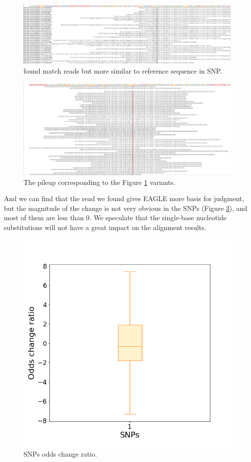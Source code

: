 \begin{figure}[H]
\centering
\includegraphics[width=1\columnwidth]{body/image/snp_new_REFread.png}
\caption[SNP worse match reads]{ found match reads but more similar to reference sequence in SNP.}
\label{snp_new_REFread}
\end{figure}

\begin{figure}[H]
\centering
\includegraphics[width=1\columnwidth]{body/image/snp_pileup_REFread.png}
\caption[SNP worse match reads pileup]{The pileup corresponding to the Figure \ref{snp_new_REFread} variants.}
\label{snp_pileup_REFread}
\end{figure}

And we can find that the read we found gives EAGLE more basis for judgment, but the magnitude of the change is not very obvious in the SNPs (Figure \ref{snp_odds_change}), and most of them are less than 0. We speculate that the single-base nucleotide substitutions will not have a great impact on the alignment results.

\begin{figure}[H]
\centering
\includegraphics[width=0.6\columnwidth]{body/image/snp_odds_change.png}
\caption[SNPs odds change ratio]{SNPs odds change ratio.}
\label{snp_odds_change}
\end{figure}

